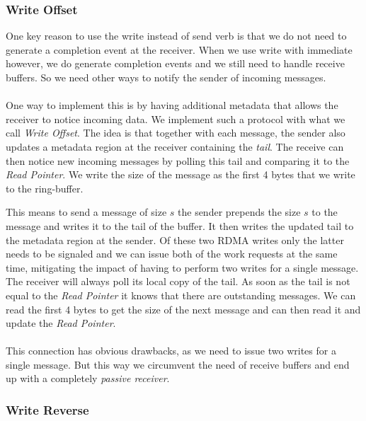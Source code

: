 \subsubsection{Write Offset}

One key reason to use the write instead of send verb is that we do not need to generate a completion event at the receiver.
 When we use  write with immediate however, we do generate completion events and we still need to handle receive
buffers. So we need other ways to notify the sender of incoming messages.

\paragraph{} One way to implement this is by having additional metadata that allows the receiver to notice incoming data.
We implement such a protocol with what we call \emph{Write Offset}. The idea is that together with each message, the sender
also updates a metadata region at the receiver containing the \emph{tail}. The receive can then notice new incoming messages
by polling this tail and comparing it to the \emph{Read Pointer}. We write the size of the message as the first 4 bytes 
that we write to the ring-buffer.

This means to send a message of size $s$ the sender prepends the size $s$ to the message and writes it to the
tail of the buffer. It then writes the updated tail to the metadata region at the sender. Of these two RDMA writes only the 
latter needs to be signaled and we can issue both of the work requests at the same time, mitigating the impact of having to 
perform two writes for a single message. The receiver will always poll its local copy of the tail. As soon as the tail is 
not equal to the \emph{Read Pointer} it knows that there are outstanding messages. We can read the first 4 bytes to get the size
of the next message and can then read it and update the \emph{Read Pointer}.

\paragraph{} This connection has obvious drawbacks, as we need to issue two writes for a single message. But this way we 
circumvent the need of receive buffers and end up with a completely \emph{passive receiver}.

\subsubsection{Write Reverse}

